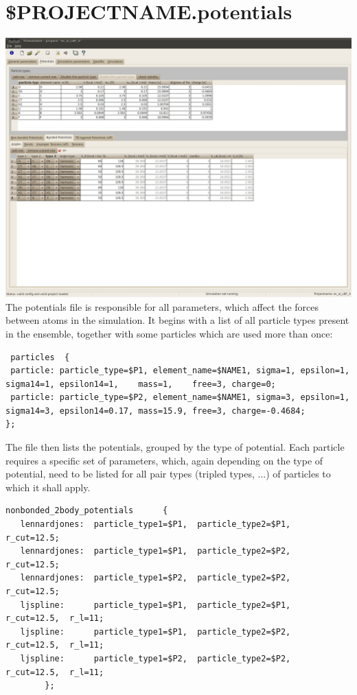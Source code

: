 \section{\$PROJECTNAME.potentials}
\label{.potentials}
\includegraphics[width=15cm]{visuals/GUI_Potentials_Bonded.jpg}
The potentials file is responsible for all parameters, which affect the forces between atoms in the simulation. It begins with a list of all particle types present in the ensemble, together with some particles which are used more than once: 
{\small
\begin{lstlisting}
 particles	{
 particle: particle_type=$P1, element_name=$NAME1, sigma=1, epsilon=1, sigma14=1, epsilon14=1,    mass=1,    free=3, charge=0;
 particle: particle_type=$P2, element_name=$NAME1, sigma=3, epsilon=1, sigma14=3, epsilon14=0.17, mass=15.9, free=3, charge=-0.4684;
};
\end{lstlisting}
}
The file then lists the potentials, grouped by the type of potential. Each particle requires a specific set of parameters, which, again depending on the type of potential, need to be listed for all pair types (tripled types, ...) of particles to which it shall apply.
\begin{lstlisting}
nonbonded_2body_potentials      {
   lennardjones:  particle_type1=$P1,  particle_type2=$P1,  r_cut=12.5;
   lennardjones:  particle_type1=$P1,  particle_type2=$P2,  r_cut=12.5;
   lennardjones:  particle_type1=$P2,  particle_type2=$P2,  r_cut=12.5;
   ljspline:      particle_type1=$P1,  particle_type2=$P1,  r_cut=12.5,  r_l=11;
   ljspline:      particle_type1=$P1,  particle_type2=$P2,  r_cut=12.5,  r_l=11;
   ljspline:      particle_type1=$P2,  particle_type2=$P2,  r_cut=12.5,  r_l=11;
        };
\end{lstlisting}

